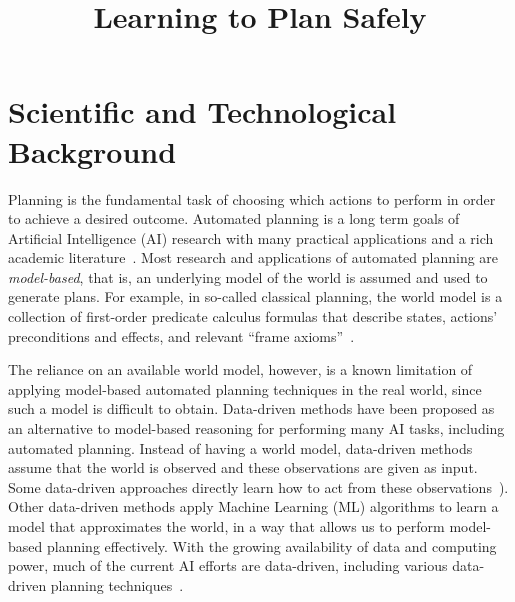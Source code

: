 \documentclass[12pt]{article}
\begin{document}
\title{Learning to Plan Safely}


\section{Scientific and Technological Background}


Planning is the fundamental task of choosing which actions to perform in order to achieve a desired outcome. 
Automated planning is a long term goals of Artificial Intelligence (AI) research with many practical applications and a rich academic literature~\cite{fox2011automatic,robinson2014cost,ruml2011line,Zamir2014UsingMD}. 
Most research and applications of automated planning are \emph{model-based}, that is, an underlying model of the world is assumed and used to generate plans. For example, in so-called classical planning, the world model is a collection of first-order predicate calculus formulas that describe states, actions' preconditions and effects, and relevant ``frame axioms''~\cite{ghallab2004automated}. 



The reliance on an available world model, however, is a known limitation of applying model-based automated planning techniques in the real world, since such a model is difficult to obtain. Data-driven methods have been proposed as an alternative to model-based reasoning for performing many AI tasks, including automated planning. 
Instead of having a world model, data-driven methods  assume that the world is observed and these observations are given as input. Some data-driven approaches directly learn how to act from these observations~\cite{kearns2002POMDPsample}). 
Other data-driven methods apply Machine Learning (ML) algorithms to learn a model that approximates the world, in a way that allows us to perform model-based planning effectively. With the growing availability of data and computing power, much of the current AI efforts are data-driven, including various data-driven planning techniques~\cite{fern2011first,juba2016jmlr}. 
\end{document}
